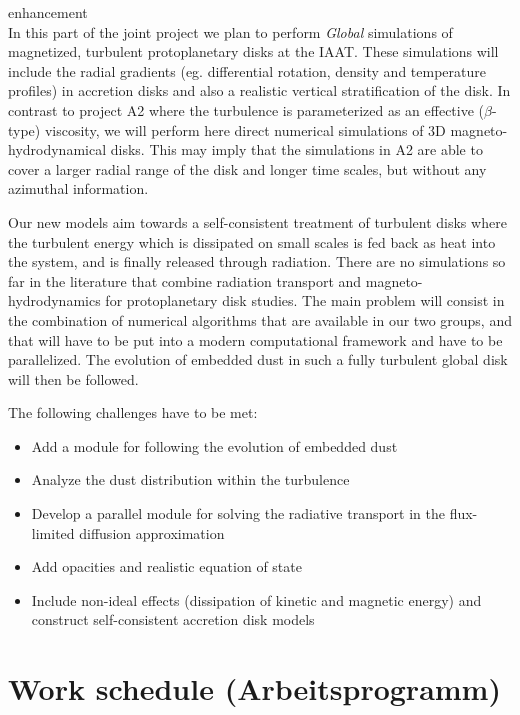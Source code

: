 \begin{itemize}
{enhancement}\\ 
%
In this part of the joint project we plan to perform {\em Global} simulations
of magnetized, turbulent protoplanetary disks at the IAAT.  These
simulations will include the radial gradients (eg. differential rotation,
density and temperature profiles) in accretion disks and also a realistic
vertical stratification of the disk.  In contrast to project A2 where the
turbulence is parameterized as an effective ($\beta$-type) viscosity, we
will perform here direct numerical simulations of 3D magneto-hydrodynamical
disks. This may imply that the simulations in A2 are able to cover a larger
radial range of the disk and longer time scales, but without any azimuthal
information.

Our new models aim towards a self-consistent treatment of turbulent disks
where the turbulent energy which is dissipated on small scales is fed back
as heat into the system, and is finally released through radiation. There
are no simulations so far in the literature that combine radiation transport
and magneto-hydrodynamics for protoplanetary disk studies.  The main
problem will consist in the combination of numerical algorithms that are
available in our two groups, and that will have to be put into a modern
computational framework and have to be parallelized.  The evolution of
embedded dust in such a fully turbulent global disk will then be followed.

\noindent
The following challenges have to be met:
%
\begin{itemize}
\item Add a module for following the evolution of embedded dust 
\item Analyze the dust distribution within the turbulence
\item Develop a parallel module for solving the radiative transport in the
 flux-limited diffusion approximation
\item Add opacities and realistic equation of state 
\item Include non-ideal effects (dissipation of kinetic and magnetic energy)
  and construct self-consistent accretion disk models
\end{itemize}

\end{itemize}
%
\section{Work schedule (Arbeitsprogramm)}
